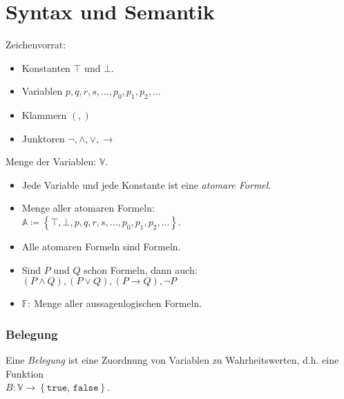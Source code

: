\section{Syntax und Semantik}
\begin{minipage}{0.9\linewidth}
Zeichenvorrat:
\begin{itemize}
 \item Konstanten $\top$ und $\bot$.
 \item Variablen $p,q,r,s,...,p_0,p_1,p_2,...$
 \item Klammern $(,)$
 \item Junktoren $\neg,\land,\lor,\to$
\end{itemize}
Menge der Variablen: $\mathbb{V}$.
\end{minipage}

\begin{minipage}{0.9\linewidth}
\begin{itemize}
 \item Jede Variable und jede Konstante ist eine \textit{atomare Formel}.
 \item Menge aller atomaren Formeln: \\
 $\mathbb{A} \coloneqq \left\{\top,\bot,p,q,r,s,...,p_0,p_1,p_2,...\right\}$.
 \item Alle atomaren Formeln sind Formeln.
 \item Sind $P$ und $Q$ schon Formeln, dann auch: $(P\land Q),(P\lor Q),(P\to Q), \neg P$
 \item $\mathbb{F}$: Menge aller aussagenlogischen Formeln.	
\end{itemize}
\end{minipage}
\vfill

\subsubsection{Belegung}%
\label{ssub:belegung}
\begin{minipage}{0.9\linewidth}
Eine \textit{Belegung} ist eine Zuordnung von Variablen zu Wahrheitswerten, d.h. eine Funktion \\
$B:\mathbb{V}\to \left\{\texttt{true, false}\right\}$.
\end{minipage}

